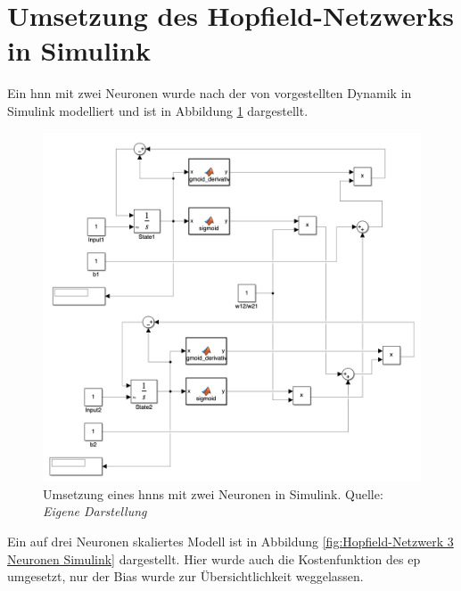 \section{Umsetzung des Hopfield-Netzwerks in Simulink}
\label{app:Umsetzung des Hopfield-Netzwerks in Simulink}

Ein \ac{hnn} mit zwei Neuronen wurde nach der von \cite{Scellier2017} vorgestellten Dynamik in Simulink modelliert und ist in Abbildung \ref{fig:Hopfield-Netzwerk 2 Neuronen Simulink} dargestellt.

\begin{figure}[h]
  \includegraphics[width=\textwidth]{abbildungen/hnn_2_neurons_simulink.png}
  \caption{Umsetzung eines \ac{hnn}s mit zwei Neuronen in Simulink. Quelle: \textit{Eigene Darstellung}}
  \label{fig:Hopfield-Netzwerk 2 Neuronen Simulink}
\end{figure}

Ein auf drei Neuronen skaliertes Modell ist in Abbildung \ref{fig:Hopfield-Netzwerk 3 Neuronen Simulink} dargestellt. Hier wurde auch die Kostenfunktion des \ac{ep} umgesetzt, nur der Bias wurde zur Übersichtlichkeit weggelassen.

